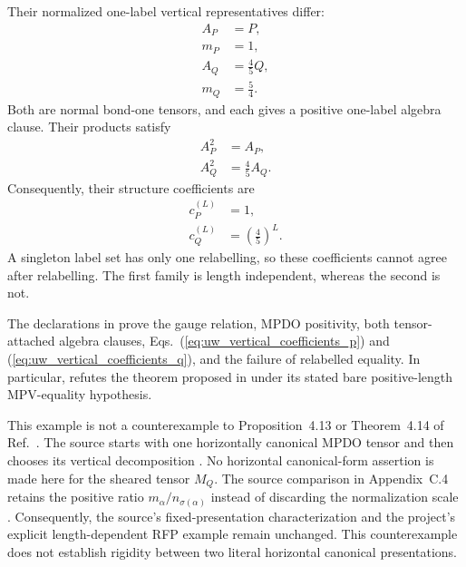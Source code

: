 \documentclass{article}
\begin{document}
Their normalized one-label vertical representatives differ:
\begin{align}
    A_P
    &=P,
    \label{eq:uw_vertical_representative_p}\\
    m_P
    &=1,
    \label{eq:uw_vertical_normalization_p}\\
    A_Q
    &=\frac45Q,
    \label{eq:uw_vertical_representative_q}\\
    m_Q
    &=\frac54.
    \label{eq:uw_vertical_normalization_q}
\end{align}
Both are normal bond-one tensors, and each gives a positive one-label algebra
clause. Their products satisfy
\begin{align}
    A_P^2
    &=A_P,
    \label{eq:uw_vertical_product_p}\\
    A_Q^2
    &=\frac45A_Q.
    \label{eq:uw_vertical_product_q}
\end{align}
Consequently, their structure coefficients are
\begin{align}
    c_P^{(L)}
    &=1,
    \label{eq:uw_vertical_coefficients_p}\\
    c_Q^{(L)}
    &=\left(\frac45\right)^L.
    \label{eq:uw_vertical_coefficients_q}
\end{align}
A singleton label set has only one relabelling, so these coefficients cannot
agree after relabelling. The first family is length independent, whereas the
second is not.

The declarations in
prove the gauge relation, MPDO positivity, both tensor-attached algebra
clauses, Eqs.~(\ref{eq:uw_vertical_coefficients_p}) and
(\ref{eq:uw_vertical_coefficients_q}), and the failure of relabelled equality.
In particular,
refutes the theorem proposed in  under its stated bare
positive-length MPV-equality hypothesis.

This example is not a counterexample to Proposition~4.13 or Theorem~4.14 of
Ref.~\cite{Cirac2016MPDO_arXiv}. The source starts with one horizontally
canonical MPDO tensor and then chooses its vertical decomposition
\cite[lines~943--991]{Cirac2016MPDO_arXiv}. No horizontal canonical-form
assertion is made here for the sheared tensor $M_Q$. The source comparison in
Appendix~C.4 retains the positive ratio
$m_\alpha/n_{\sigma(\alpha)}$ instead of discarding the normalization scale
\cite[lines~1997--2008]{Cirac2016MPDO_arXiv}. Consequently, the source's
fixed-presentation characterization and the project's explicit
length-dependent RFP example remain unchanged. This counterexample does not
establish rigidity between two literal horizontal canonical presentations.
\end{document}
